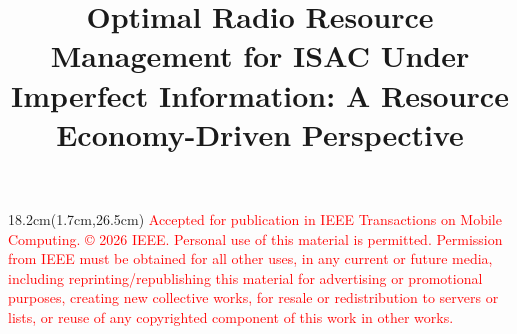 \documentclass[10pt,journal,compsoc]{IEEEtran}
\theoremstyle{myremark}
\theoremstyle{myexample}
\begin{document}
	
\begin{textblock*}{18.2cm}(1.7cm,26.5cm) %
	\footnotesize
	\textcolor{red}{
	Accepted for publication in IEEE Transactions on Mobile Computing. © 2026 IEEE. Personal use of this material is permitted. Permission from IEEE must be obtained for all other uses, in any current or future media, including reprinting/republishing this material for advertising or promotional purposes, creating new collective works, for resale or redistribution to servers or lists, or reuse of any copyrighted component of this work in other works.}
\end{textblock*}
	




\title{\Huge Optimal Radio Resource Management for ISAC Under Imperfect Information: A Resource Economy-Driven Perspective}









\end{document}
